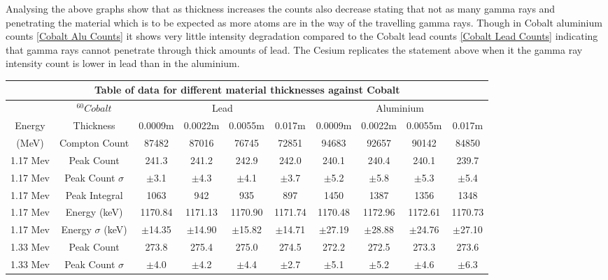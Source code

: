 \documentclass[12pt]{article}
\begin{document}
Analysing the above graphs show that as thickness increases the counts also decrease stating that not as many gamma rays and penetrating the material which is to be expected as more atoms are in the way of the travelling gamma rays. Though in Cobalt aluminium counts \cref{Cobalt Alu Counts} it shows very little intensity degradation compared to the Cobalt lead counts \cref{Cobalt Lead Counts} indicating that gamma rays cannot penetrate through thick amounts of lead. The Cesium replicates the statement above when it the gamma ray intensity count is lower in lead than in the aluminium.\\

\begin{table}[H]
\begin{center}
 \footnotesize
 \begin{tabular}{|c||c||c|c|c|c||c|c|c|c|}
 \hline
 \multicolumn{10}{|c|}{Table of data for different material thicknesses against Cobalt} \\
 \hline \hline
 \multicolumn{1}{|c||}{} & \multicolumn{1}{|c||}{$^{60}Cobalt$} & \multicolumn{4}{|c||}{Lead} & \multicolumn{4}{c|}{Aluminium} \\
 \hline
  Energy & Thickness & 0.0009m & 0.0022m & 0.0055m & 0.017m & 0.0009m & 0.0022m & 0.0055m & 0.017m\\
 \hline \hline
  (MeV)& Compton Count & 87482 & 87016 &76745 & 72851 & 94683 & 92657 & 90142 & 84850 \\
 \hline \hline
 1.17 Mev & Peak Count & 241.3 & 241.2 & 242.9 & 242.0 & 240.1 & 240.4 & 240.1 & 239.7 \\
 \hline
 1.17 Mev & Peak Count $\sigma$ & $\pm$3.1 & $\pm$4.3 & $\pm$4.1 & $\pm$3.7 & $\pm$5.2 & $\pm$5.8 & $\pm$5.3 & $\pm$5.4 \\
 \hline
 1.17 Mev & Peak Integral & 1063 & 942 & 935 & 897 & 1450 & 1387 & 1356 & 1348 \\
 \hline
 1.17 Mev & Energy (keV) & 1170.84 & 1171.13 & 1170.90 & 1171.74 & 1170.48 & 1172.96 & 1172.61 & 1170.73 \\
 \hline
 1.17 Mev & Energy $\sigma$ (keV) & $\pm$14.35 & $\pm$14.90 & $\pm$15.82 & $\pm$14.71 & $\pm$27.19 & $\pm$28.88 & $\pm$24.76 & $\pm$27.10 \\
 \hline \hline
 1.33 Mev & Peak Count & 273.8 & 275.4 & 275.0 & 274.5 & 272.2 & 272.5 & 273.3 & 273.6 \\
 \hline
 1.33 Mev & Peak Count $\sigma$ & $\pm$4.0 & $\pm$4.2 & $\pm$4.4 & $\pm$2.7 & $\pm$5.1 & $\pm$5.2 & $\pm$4.6 & $\pm$6.3 \\

\end{tabular}
\end{center}
\end{table}
\end{document}

